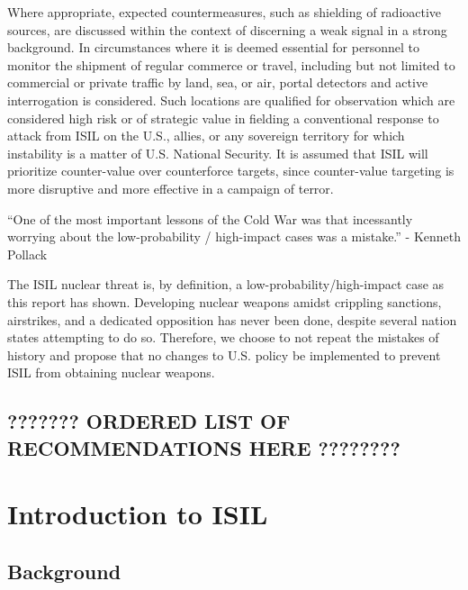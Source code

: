 \documentclass{report}
\begin{document}
Where appropriate, expected countermeasures, such as shielding of radioactive sources, are discussed within the context of discerning a weak signal in a strong background. In circumstances where it is deemed essential for personnel to monitor the shipment of regular commerce or travel, including but not limited to commercial or private traffic by land, sea, or air, portal detectors and active interrogation is considered. Such locations are qualified for observation which are considered high risk or of strategic value in fielding a conventional response to attack from ISIL on the U.S., allies, or any sovereign territory for which instability is a matter of U.S. National Security. It is assumed that ISIL will prioritize counter-value over counterforce targets, since counter-value targeting is more disruptive and more effective in a campaign of terror.


\enquote{One of the most important lessons of the Cold War was that incessantly worrying about the low-probability / high-impact cases was a mistake.}  - Kenneth Pollack \cite{pollack2014unthinkable}

The ISIL nuclear threat is, by definition, a low-probability/high-impact case as this report has shown.  Developing nuclear weapons amidst crippling sanctions, airstrikes, and a dedicated opposition has never been done, despite several nation states attempting to do so.  Therefore, we choose to not repeat the mistakes of history and propose that no changes to U.S. policy be implemented to prevent ISIL from obtaining nuclear weapons.

\section{??????? ORDERED LIST OF RECOMMENDATIONS HERE ????????}






\chapter{Introduction to ISIL}





   
   

    
    
    
    \section{Background}
    
\end{document}
